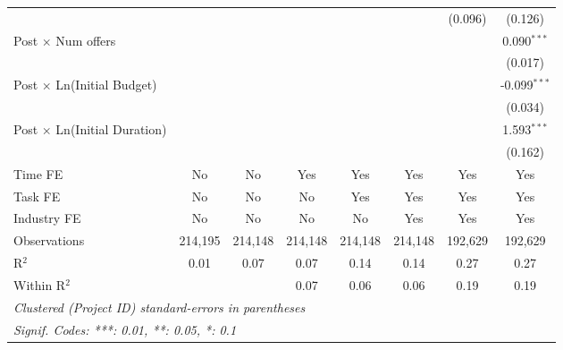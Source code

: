 \documentclass[
]{article}
\begin{document}
\begin{tabular}{lccccccc}
                                                           &                &                &                &                &                & (0.096)        & (0.126)\\   
   Post $\times$ Num offers                                &                &                &                &                &                &                & 0.090$^{***}$\\   
                                                           &                &                &                &                &                &                & (0.017)\\   
   Post $\times$ Ln(Initial Budget)                        &                &                &                &                &                &                & -0.099$^{***}$\\   
                                                           &                &                &                &                &                &                & (0.034)\\   
   Post $\times$ Ln(Initial Duration)                      &                &                &                &                &                &                & 1.593$^{***}$\\   
                                                           &                &                &                &                &                &                & (0.162)\\   
   Time FE                                                 & No             & No             & Yes            & Yes            & Yes            & Yes            & Yes\\  
   Task FE                                                 & No             & No             & No             & Yes            & Yes            & Yes            & Yes\\  
   Industry FE                                             & No             & No             & No             & No             & Yes            & Yes            & Yes\\  
   Observations                                            & 214,195        & 214,148        & 214,148        & 214,148        & 214,148        & 192,629        & 192,629\\  
   R$^2$                                                   & 0.01           & 0.07           & 0.07           & 0.14           & 0.14           & 0.27           & 0.27\\  
   Within R$^2$                                            &                &                & 0.07           & 0.06           & 0.06           & 0.19           & 0.19\\  
   \midrule
   \multicolumn{8}{l}{\emph{Clustered (Project ID) standard-errors in parentheses}}\\
   \multicolumn{8}{l}{\emph{Signif. Codes: ***: 0.01, **: 0.05, *: 0.1}}\\
\end{tabular}
\end{document}
